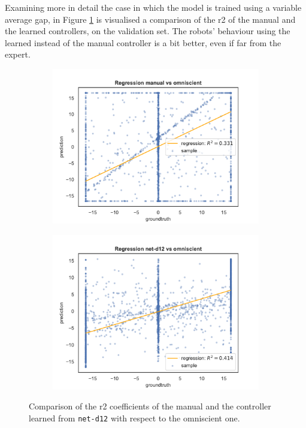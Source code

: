Examining more in detail the case in which the model is trained using a 
variable average gap, in Figure \ref{fig:net-d12r2} is visualised a comparison of 
the \gls{r2} of the manual and the learned controllers, on the validation set. 
The robots' behaviour using the learned instead of the manual controller is a 
bit better, even if far from the expert.
\begin{figure}[!htb]
	\centering
	\begin{subfigure}[h]{0.49\textwidth}
		\centering
		\includegraphics[width=\textwidth]{contents/images/net-d12/regression-manualvsomniscient}%
	\end{subfigure}
	\hfill
	\begin{subfigure}[h]{0.49\textwidth}
		\centering
		\includegraphics[width=\textwidth]{contents/images/net-d12/regression-net-d12-vs-omniscient}
	\end{subfigure}
	\caption[Evaluation of the \gls{r2} coefficients of \texttt{net-d12} 
	.]{Comparison 
		of the \gls{r2} coefficients of the manual and the controller learned from 
		\texttt{net-d12} with respect to the omniscient one.}
	\label{fig:net-d12r2}
\end{figure}

